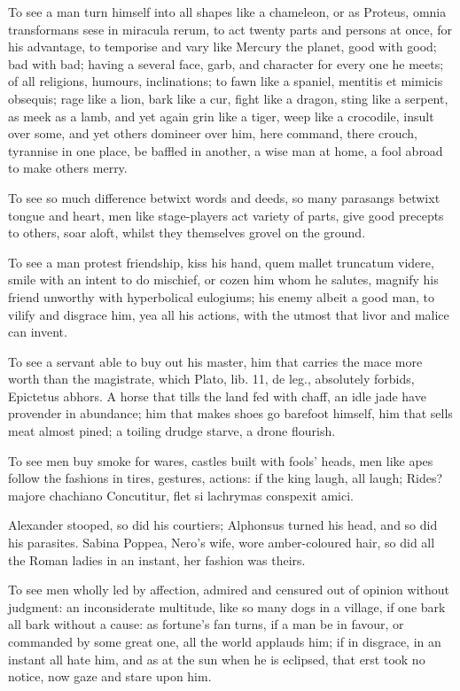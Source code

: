 {To see a man turn himself into all shapes like a chameleon, or as
Proteus, omnia transformans sese in miracula rerum, to act twenty parts
and persons at once, for his advantage, to temporise and vary like
Mercury the planet, good with good; bad with bad; having a several
face, garb, and character for every one he meets; of all religions,
humours, inclinations; to fawn like a spaniel, mentitis et mimicis
obsequis; rage like a lion, bark like a cur, fight like a dragon, sting
like a serpent, as meek as a lamb, and yet again grin like a tiger,
weep like a crocodile, insult over some, and yet others domineer over
him, here command, there crouch, tyrannise in one place, be baffled in
another, a wise man at home, a fool abroad to make others merry.

To see so much difference betwixt words and deeds, so many parasangs
betwixt tongue and heart, men like stage-players act variety of parts,
give good precepts to others, soar aloft, whilst they themselves
grovel on the ground.

To see a man protest friendship, kiss his hand, quem mallet
truncatum videre, smile with an intent to do mischief, or cozen
him whom he salutes, magnify his friend unworthy with hyperbolical
eulogiums; his enemy albeit a good man, to vilify and disgrace him, yea
all his actions, with the utmost that livor and malice can invent.

To see a servant able to buy out his master, him that carries the
mace more worth than the magistrate, which Plato, lib. 11, de leg.,
absolutely forbids, Epictetus abhors. A horse that tills the land
fed with chaff, an idle jade have provender in abundance; him that
makes shoes go barefoot himself, him that sells meat almost pined; a
toiling drudge starve, a drone flourish.

To see men buy smoke for wares, castles built with fools' heads, men
like apes follow the fashions in tires, gestures, actions: if the king
laugh, all laugh;
Rides? majore chachiano
Concutitur, flet si lachrymas conspexit amici.

Alexander stooped, so did his courtiers; Alphonsus turned his
head, and so did his parasites. Sabina Poppea, Nero's wife, wore
amber-coloured hair, so did all the Roman ladies in an instant, her
fashion was theirs.

To see men wholly led by affection, admired and censured out of opinion
without judgment: an inconsiderate multitude, like so many dogs in a
village, if one bark all bark without a cause: as fortune's fan turns,
if a man be in favour, or commanded by some great one, all the world
applauds him; if in disgrace, in an instant all hate him, and as
at the sun when he is eclipsed, that erst took no notice, now gaze and
stare upon him.

}
